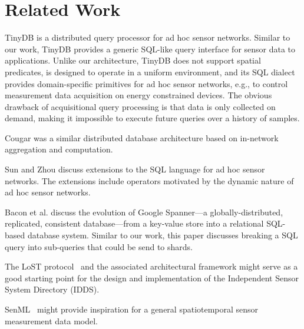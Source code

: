 \documentclass[conference,10pt]{IEEEtran}
\begin{document}
%
%
%

\section{Related Work}
\label{sec:related-work}


TinyDB \cite{madden2005tinydb} is a distributed query processor for ad hoc sensor networks. Similar to our work, TinyDB provides a generic SQL-like query interface for sensor data to applications. Unlike our architecture, TinyDB does not support spatial predicates, is designed to operate in a uniform environment, and its SQL dialect provides domain-specific primitives for ad hoc sensor networks, e.g., to control measurement data acquisition on energy constrained devices. The obvious drawback of acquisitional query processing is that data is only collected on demand, making it impossible to execute future queries over a history of samples.

Cougar \cite{yao2002cougar} was a similar distributed database architecture based on in-network aggregation and computation.

Sun and Zhou \cite{sun2010querying} discuss extensions to the SQL language for ad hoc sensor networks. The extensions include operators motivated by the dynamic nature of ad hoc sensor networks.

Bacon et al. \cite{bacon2017spanner} discuss the evolution of Google Spanner---a globally-distributed, replicated, consistent database---from a key-value store into a relational SQL-based database system. Similar to our work, this paper discusses breaking a SQL query into sub-queries that could be send to shards.

The LoST protocol~\cite{rfc5222} and the associated architectural framework \cite{rfc5012,rfc5582} might serve as a good starting point for the design and implementation of the Independent Sensor System Directory (IDDS).

SenML~\cite{rfc8428} might provide inspiration for a general spatiotemporal sensor measurement data model.
\end{document}
